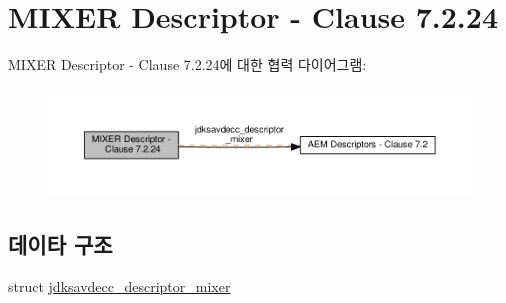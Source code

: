 \hypertarget{group__descriptor__mixer}{}\section{M\+I\+X\+ER Descriptor -\/ Clause 7.2.24}
\label{group__descriptor__mixer}
M\+I\+X\+ER Descriptor -\/ Clause 7.2.24에 대한 협력 다이어그램\+:
\nopagebreak
\begin{figure}[H]
\begin{center}
\leavevmode
\includegraphics[width=350pt]{group__descriptor__mixer}
\end{center}
\end{figure}
\subsection*{데이타 구조}
\begin{DoxyCompactItemize}
\item 
struct \hyperlink{structjdksavdecc__descriptor__mixer}{jdksavdecc\+\_\+descriptor\+\_\+mixer}
\end{DoxyCompactItemize}
